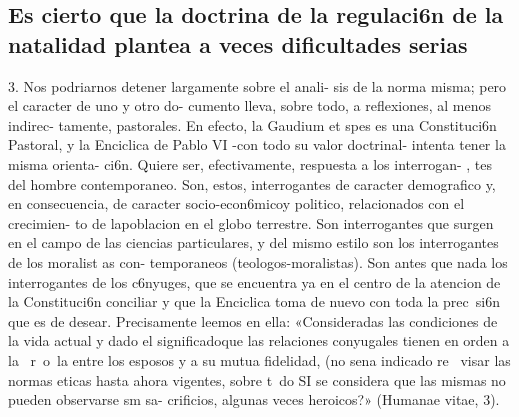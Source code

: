 \documentclass[letterpaper]{report}
\begin{document}
		\subsection{Es cierto que la doctrina de la regulaci6n de la natalidad 
		plantea a veces dificultades serias}
			3. Nos podriarnos detener largamente sobre el anali- 
			sis de la norma misma; pero el caracter de uno y otro do- 
			cumento lleva, sobre todo, a reflexiones, al menos indirec- 
			tamente, pastorales. En efecto, la Gaudium et spes es una 
			Constituci6n Pastoral, y la Enciclica de Pablo VI -con 
			todo su valor doctrinal- intenta tener la misma orienta- 
			ci6n. Quiere ser, efectivamente, respuesta a los interrogan- 
			, tes del hombre contemporaneo. Son, estos, interrogantes 
			de caracter demografico y, en consecuencia, de caracter 
			socio-econ6micoy politico, relacionados con el crecimien- 
			to de lapoblacion en el globo terrestre. Son interrogantes 
			que surgen en el campo de las ciencias particulares, y del 
			mismo estilo son los interrogantes de los moralist as con- 
			temporaneos (teologos-moralistas). Son antes que nada 
			los interrogantes de los c6nyuges, que se encuentra ya en 
			el centro de la atencion de la Constituci6n conciliar y que
			la Enciclica toma de nuevo con toda la prec~si6n que es 
			de desear. Precisamente leemos en ella: «Consideradas las 
			condiciones de la vida actual y dado el significadoque las 
			relaciones conyugales tienen en orden a la ~r~o~la entre 
			los esposos y a su mutua fidelidad, (no sena indicado re~ 
			visar las normas eticas hasta ahora vigentes, sobre t~do SI 
			se considera que las mismas no pueden observarse sm sa- 
			crificios, algunas veces heroicos?» (Humanae vitae, 3).
			
\end{document}
